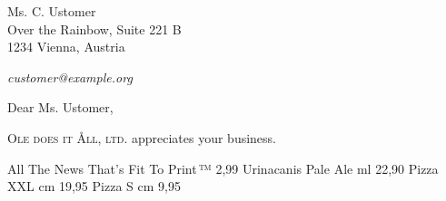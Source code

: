 \documentclass[fontsize=11pt,parskip=full]{scrlttr2}
\begin{document}
	\def\payperiod		{3}		%
					\def\invoicenumber	{44}	%
	\begin{letter}{%
%
					Ms. C. Ustomer\\
					Over the Rainbow, Suite 221\kern 1pt B\\
					1234 Vienna, Austria\\				
					\vspace{.25em}\par		%
					 \hfill\emph{customer@example.org}
	}
		\opening{Dear Ms. Ustomer,}

		\textsc{Ole does it Åll, ltd.} appreciates your business.

		\begin{invoice}[N]				%
			\NumbersOff					%
			\SeparatorOff


\makeatletter
	\renewcommand*\@amount		{~}					%
	\renewcommand*\@description	{Description}		%
	\renewcommand*\@unitprice	{Unit price}		%
	\renewcommand*\@totalprice	{Total price}		%

	\renewcommand*\@taxabrv		{Combined Sales Tax}
	\renewcommand*\@sumnet		{Subtotal}	%
	\renewcommand*\@sumtot		{Total}	%
	\renewcommand*\@excl		{}	%

\makeatother
	{All The News That's Fit To Print\,™}		{2,99}
		{Urinacanis Pale Ale		 ml}	{22,90}
		{Pizza XXL					 cm}		{19,95}
		{Pizza S					 cm}		{9,95}

		\end{invoice}



\end{letter}
\end{document}
